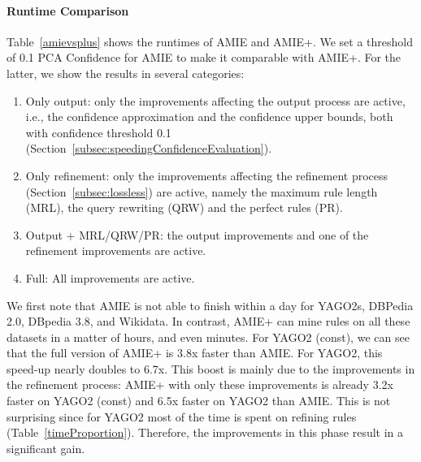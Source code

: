\paragraph{Runtime Comparison}
Table~\ref{amievsplus} shows the runtimes of AMIE and AMIE+. We set a threshold of 0.1 PCA Confidence for AMIE to make it
comparable with AMIE+. For the latter, we show the results in several categories:
\begin{enumerate}
 \item Only output: only the improvements affecting the output process are active, i.e.,
 the confidence approximation and the confidence upper bounds, both with confidence threshold 0.1 (Section~\ref{subsec:speedingConfidenceEvaluation}).
 \item Only refinement: only the improvements affecting the refinement process (Section~\ref{subsec:lossless}) are active, namely the
 maximum rule length (MRL), the query rewriting (QRW) and the perfect rules (PR).
 \item Output + MRL/QRW/PR: the output improvements and one of the refinement improvements are active.
 \item Full: All improvements are active.
\end{enumerate}

We first note that AMIE is not able to finish within a day for YAGO2s, DBPedia 2.0, DBpedia 3.8, and Wikidata. In contrast,
AMIE+ can mine rules on all these datasets in a matter of hours, and even minutes.
For YAGO2 (const), we can see that the full version of AMIE+ is 3.8x faster than AMIE.
For YAGO2, this speed-up nearly doubles to 6.7x. This boost is mainly due to the improvements
in the refinement process: AMIE+ with only these improvements is already 3.2x faster on YAGO2 (const) and 6.5x faster on YAGO2 than AMIE.
This is not surprising since
for YAGO2 most of the time is spent on refining rules (Table~\ref{timeProportion}). Therefore, the improvements in this phase result in a significant gain.

